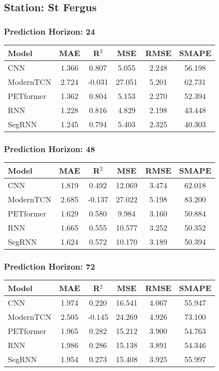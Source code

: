 \subsection*{Station: St Fergus}
\subsubsection*{Prediction Horizon: 24}
\begin{tabular}{lccccc}
\toprule
Model & MAE & R$^2$ & MSE & RMSE & SMAPE \\
\midrule
CNN & 1.366 & 0.807 & 5.055 & 2.248 & 56.198 \\
ModernTCN & 2.724 & -0.031 & 27.051 & 5.201 & 62.731 \\
PETformer & 1.362 & 0.804 & 5.153 & 2.270 & 52.394 \\
RNN & 1.228 & 0.816 & 4.829 & 2.198 & 43.448 \\
SegRNN & 1.245 & 0.794 & 5.403 & 2.325 & 40.303 \\
\bottomrule
\end{tabular}
\vspace{0.5cm}
\subsubsection*{Prediction Horizon: 48}
\begin{tabular}{lccccc}
\toprule
Model & MAE & R$^2$ & MSE & RMSE & SMAPE \\
\midrule
CNN & 1.819 & 0.492 & 12.069 & 3.474 & 62.018 \\
ModernTCN & 2.685 & -0.137 & 27.022 & 5.198 & 83.200 \\
PETformer & 1.629 & 0.580 & 9.984 & 3.160 & 50.884 \\
RNN & 1.665 & 0.555 & 10.577 & 3.252 & 50.352 \\
SegRNN & 1.624 & 0.572 & 10.170 & 3.189 & 50.394 \\
\bottomrule
\end{tabular}
\vspace{0.5cm}
\subsubsection*{Prediction Horizon: 72}
\begin{tabular}{lccccc}
\toprule
Model & MAE & R$^2$ & MSE & RMSE & SMAPE \\
\midrule
CNN & 1.974 & 0.220 & 16.541 & 4.067 & 55.947 \\
ModernTCN & 2.505 & -0.145 & 24.269 & 4.926 & 73.100 \\
PETformer & 1.965 & 0.282 & 15.212 & 3.900 & 54.763 \\
RNN & 1.986 & 0.286 & 15.138 & 3.891 & 54.346 \\
SegRNN & 1.954 & 0.273 & 15.408 & 3.925 & 55.997 \\
\bottomrule
\end{tabular}
\vspace{0.5cm}
